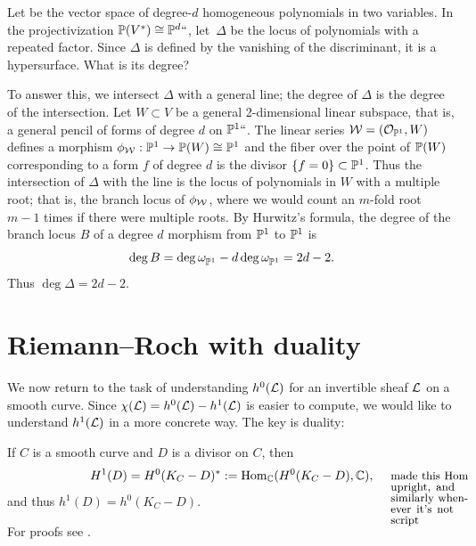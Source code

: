 \begin{example}
Let 
be the vector space of degree-$d$ homogeneous polynomials in
two variables. In the
projectivization $\mathbb P(V^{*}) \cong \mathbb P^d` `$, let~$\Delta$ be the
locus of polynomials with a repeated factor. Since $\Delta$ is
defined by the vanishing of the discriminant, it is a hypersurface.
What is its degree? 
 
To answer this, we intersect $\Delta$ with a general line; the degree
of $\Delta$ is the degree of the intersection.  Let $W\subset V$ be a
general 2-dimensional linear subspace, that is, a general pencil of
forms of degree $d$ on $\mathbb P^1` `$. The linear series ${\mathcal W} =
({\mathcal O}_{\mathbb P^{1}}, W)$ defines a morphism $\phi_{{\mathcal W}} : \mathbb P^{1} \to
\mathbb P(W) \cong \mathbb P^{1}$ and the fiber over the point of $\mathbb P(W)$
corresponding to a form $f$ of degree $d$ is the divisor $\{f =
0\}\subset \mathbb P^{1}$. Thus the intersection of $\Delta$ with the line
is the locus of polynomials in $W$ with a multiple root; that is, the
branch locus of $\phi_{{\mathcal W}}$, where we would count an $m$-fold root
$m-1$ times if there were multiple roots. 
 By Hurwitz's formula, the degree of the branch locus $B$ of a 
degree $d$ morphism from $\mathbb P^{1}$ to $\mathbb P^{1}$ is
 $$
 \deg B = \deg \omega^{}_{\mathbb P^{1}} - d\deg \omega^{}_{\mathbb P^{1}} = 2d-2.
 $$
 Thus $\deg \Delta = 2d-2$.
 \end{example}
  

\section{Riemann--Roch with duality}

We now return to the task of understanding $h^0({\mathcal L})$ for an invertible sheaf ${\mathcal L}$ on a smooth curve. Since $\chi({\mathcal L}) = h^0({\mathcal L})-h^1({\mathcal L})$ is easier to compute, we would like to understand $h^1({\mathcal L})$ in a more concrete way. The key is duality:
 
\begin{theorem}\label{sd}
If $C$ is a smooth curve and $D$ is a divisor on $C$, then
%
%
%
$$
H^1(D) =H^0(K_C-D)^* := \Hom_\CC(H^0(K_C-D), \CC),
\marginparhere{made this Hom upright, and similarly whenever it's not script}
$$
and thus $h^1(D) = h^0(K_C-D)$.
\end{theorem}

For proofs see \cite[Theorem III.5.2 and III.7.6]{Hartshorne1977}. 

